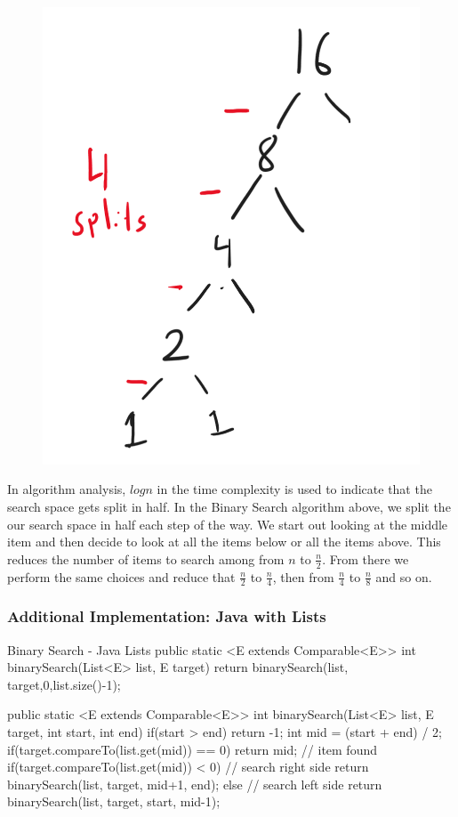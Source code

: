 \begin{figure}
	\centering
	\includegraphics[width=0.7\linewidth]{pics/log16}
	\caption{}
	\label{fig:log16}
\end{figure}



In algorithm analysis, $log n$ in the time complexity is used to indicate that the search space gets split in half.
In the Binary Search algorithm above, we split the our search space in half each step of the way.  We start out looking at the middle item and then decide to look at all the items below or all the items above.  This reduces the number of items to search among from $n$ to $\frac{n}{2}$.  From there we perform the same choices and reduce that $\frac{n}{2}$ to $\frac{n}{4}$, then from  $\frac{n}{4}$ to  $\frac{n}{8}$ and so on.

\subsubsection{Additional Implementation: Java with Lists}


\begin{javacode}{Binary Search - Java Lists}
    public static <E extends Comparable<E>> int binarySearch(List<E> list, E target) {
	return binarySearch(list, target,0,list.size()-1);
}

public static <E extends Comparable<E>> int binarySearch(List<E> list, E target, int start, int end) {
	if(start > end) {
		return -1;
	}
	int mid = (start + end) / 2;
	if(target.compareTo(list.get(mid)) == 0) {
		return mid; // item found
	}
	if(target.compareTo(list.get(mid)) < 0) {
		// search right side
		return binarySearch(list, target, mid+1, end);
	} else {
		// search left side
		return binarySearch(list, target, start, mid-1);
	}
}
\end{javacode}

